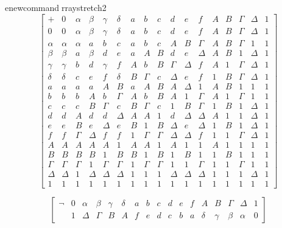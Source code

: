 enewcommand{rraystretch}{2}
  \[\begin{bmatrix}
   + & 0 & \alpha & \beta & \gamma & \delta & a & b & c & d & e & f & A & B & \Gamma & \Delta & 1 \\
  0 & 0 & \alpha & \beta & \gamma & \delta & a & b & c & d & e & f & A & B & \Gamma & \Delta & 1 \\
  \alpha & \alpha & \alpha & a & b & c & a & b & c & A & B & \Gamma & A & B & \Gamma & 1 & 1 \\
  \beta & \beta & a & \beta & d & e & a & A & B & d & e & \Delta & A & B & 1 & \Delta & 1 \\
  \gamma & \gamma & b & d & \gamma & f & A & b & B & \Gamma & \Delta & f & A & 1 & \Gamma & \Delta & 1 \\
  \delta & \delta & c & e & f & \delta & B & \Gamma & c & \Delta & e & f & 1 & B & \Gamma & \Delta & 1 \\
  a & a & a & a & A & B & a & A & B & A & \Delta & 1 & A & B & 1 & 1 & 1 \\
  b & b & b & A & b & \Gamma & A & b & B & A & 1 & \Gamma & A & 1 & \Gamma & 1 & 1 \\
  c & c & c & B & \Gamma & c & B & \Gamma & c & 1 & B & \Gamma & 1 & B & 1 & \Delta & 1 \\
  d & d & A & d & d & \Delta & A & A & 1 & d & \Delta & \Delta & A & 1 & 1 & \Delta & 1 \\
  e & e & B & e & \Delta & e & B & 1 & B & \Delta & e & \Delta & 1 & B & 1 & \Delta & 1 \\
  f & f & \Gamma & \Delta & f & f & 1 & \Gamma & \Gamma & \Delta & \Delta & f & 1 & 1 & \Gamma & \Delta & 1 \\
  A & A & A & A & A & 1 & A & A & 1 & A & 1 & 1 & A & 1 & 1 & 1 & 1 \\
  B & B & B & B & 1 & B & B & 1 & B & 1 & B & 1 & 1 & B & 1 & 1 & 1 \\
  \Gamma & \Gamma & \Gamma & 1 & \Gamma & \Gamma & 1 & \Gamma & \Gamma & 1 & 1 & \Gamma & 1 & 1 & \Gamma & 1 & 1 \\
  \Delta & \Delta & 1 & \Delta & \Delta & \Delta & 1 & 1 & 1 & \Delta & \Delta & \Delta & 1 & 1 & 1 & \Delta & 1 \\
  1 & 1 & 1 & 1 & 1 & 1 & 1 & 1 & 1 & 1 & 1 & 1 & 1 & 1 & 1 & 1 & 1
  \end{bmatrix}\]

\[\begin{bmatrix}
\neg & 0 & \alpha & \beta & \gamma & \delta & a & b & c & d & e & f & A & B & \Gamma & \Delta & 1 \\
 & 1 & \Delta & \Gamma & B & A & f & e & d & c & b & a & \delta & \gamma & \beta & \alpha & 0
\end{bmatrix}\]

